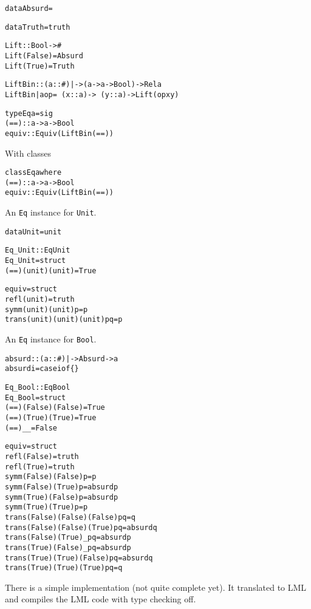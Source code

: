 \documentclass[17pt]{foils} %
\begin{document}
\newpage
\begin{alltt}
data Absurd =

data Truth = truth

Lift :: Bool -> #
Lift (False) = Absurd
Lift (True)  = Truth

LiftBin :: (a :: #) |-> (a -> a -> Bool) -> Rel a
LiftBin |a op = \ (x::a) -> \ (y::a) -> Lift (op x y)

type Eq a = sig
    (==) :: a -> a -> Bool
    equiv :: Equiv (LiftBin (==))

\end{alltt}

With classes
\begin{alltt}
class Eq a where
    (==) :: a -> a -> Bool
    equiv :: Equiv (LiftBin (==))
\end{alltt}

\newpage
An {\tt Eq} instance for {\tt Unit}.

\begin{alltt}
data Unit = unit

Eq_Unit :: Eq Unit
Eq_Unit = struct 
    (==) (unit) (unit) = True

    equiv = struct
        refl (unit) = truth
        symm (unit) (unit) p = p
        trans (unit) (unit) (unit) p q = p
\end{alltt}

\newpage
An {\tt Eq} instance for {\tt Bool}.

\begin{alltt}
absurd :: (a :: #) |-> Absurd -> a
absurd i = case i of \{ \}

Eq_Bool :: Eq Bool
Eq_Bool = struct
    (==) (False) (False) = True
    (==) (True)  (True)  = True
    (==) _       _       = False

    equiv = struct
        refl (False) = truth
        refl (True)  = truth
        symm (False) (False) p = p
        symm (False) (True)  p = absurd p
        symm (True)  (False) p = absurd p
        symm (True)  (True)  p = p
        trans (False) (False) (False) p q = q
        trans (False) (False) (True)  p q = absurd q
        trans (False) (True)  _       p q = absurd p
        trans (True)  (False) _       p q = absurd p
        trans (True)  (True)  (False) p q = absurd q
        trans (True)  (True)  (True)  p q = q
\end{alltt}

\newpage
{}

There is a simple implementation (not quite complete yet).
It translated to LML and compiles the LML code with type checking off.
\end{document}
